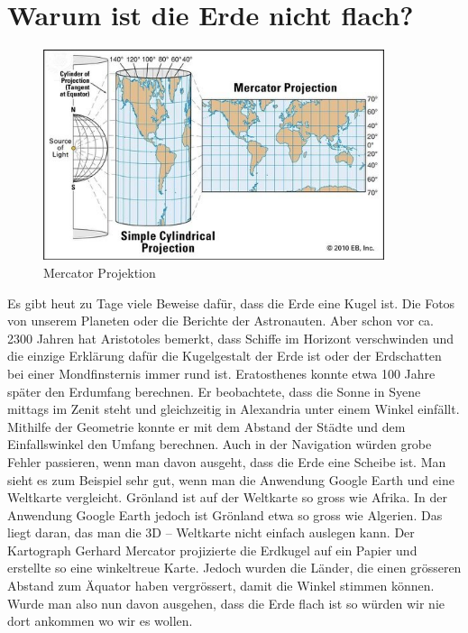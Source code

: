 \documentclass[12pt]{scrartcl}
\begin{document}
	\section{Warum ist die Erde nicht flach?}
	
 \begin{figure}[h]
 	\begin{center}
 		\includegraphics[width=10cm]{bilder/projektion.png}
 		\caption{Mercator Projektion}
 	\end{center}	
 \end{figure}

Es gibt heut zu Tage viele Beweise dafür, dass die Erde eine Kugel ist. 
Die Fotos von unserem	Planeten oder die Berichte der Astronauten. 
	Aber schon vor ca. 2300 Jahren hat Aristotoles bemerkt, dass Schiffe im Horizont verschwinden und die einzige Erklärung dafür die Kugelgestalt der Erde ist oder der Erdschatten bei einer Mondfinsternis immer rund ist. 
	Eratosthenes konnte etwa 100 Jahre später den Erdumfang berechnen. 
	Er beobachtete, dass die Sonne in Syene mittags im Zenit steht und gleichzeitig in Alexandria unter einem Winkel einfällt. 
	Mithilfe der Geometrie konnte er mit dem Abstand der Städte und dem Einfallswinkel den Umfang berechnen.
	Auch in der Navigation würden grobe Fehler passieren, wenn man davon ausgeht, dass die Erde eine Scheibe ist. 
Man sieht es zum Beispiel sehr gut, wenn man die Anwendung Google Earth und eine Weltkarte vergleicht. Grönland ist auf der Weltkarte so gross wie Afrika. 
In der Anwendung Google Earth jedoch ist Grönland etwa so gross wie Algerien. 
Das liegt daran, das man die 3D – Weltkarte nicht einfach auslegen kann. 
Der Kartograph Gerhard Mercator projizierte die Erdkugel auf ein Papier und erstellte so eine winkeltreue Karte. Jedoch wurden die Länder, die einen grösseren Abstand zum Äquator haben vergrössert, damit die Winkel stimmen können. 
Wurde man also nun davon ausgehen, dass die Erde flach ist so würden wir nie dort ankommen wo wir es wollen.
	
	
\end{document}

